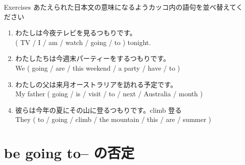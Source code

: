 \documentclass[aspectratio=169,xcolor={dvipsnames,table}]{beamer}
\newcommand{\myaudio}[1]{\href{#1}{\faVolumeUp}}
\begin{document}
\begin{frame}[plain]{Exercises}
 あたえられた日本文の意味になるようカッコ内の語句を並べ替えてください\hfill\myaudio{./audio/011_be_going_to_02.mp3}


\begin{enumerate}
 \item わたしは今夜テレビを見るつもりです。\\
( TV / I / am / watch / going / to ) tonight.\\
 \item わたしたちは今週末パーティーをするつもりです。\\
We ( going / are / this weekend / a party / have / to )\\
 \item わたしの父は来月オーストラリアを訪れる予定です。\\
My father ( going / is / visit / to / next / Australia / month )\\
 \item 彼らは今年の夏にその山に登るつもりです。\hfill{\scriptsize climb  登る}\\
They ( to / going / climb / the mountain / this / are / summer )\\
\end{enumerate}
\end{frame}

\section{be going to-- の否定}
\end{document}
